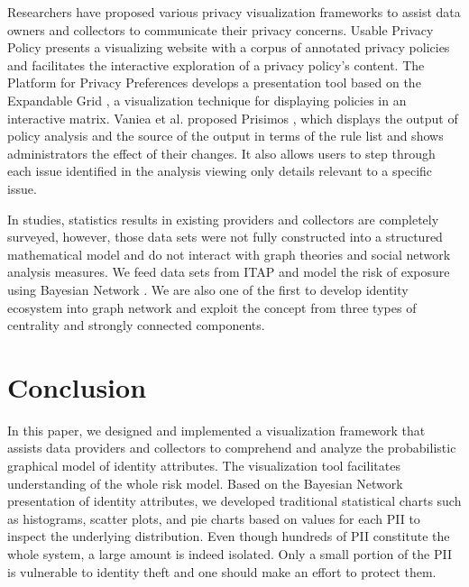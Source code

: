 \documentclass[conference]{IEEEtran}
\begin{document}
Researchers have proposed various privacy visualization frameworks to assist data owners and collectors to communicate their privacy concerns. Usable Privacy Policy \cite{Cherivirala2016VisualizationAI} presents a visualizing website with a corpus of annotated privacy policies and facilitates the interactive exploration of a privacy policy's content. The Platform for Privacy Preferences \cite{FaithCranor2011} develops a presentation
tool based on the Expandable Grid \cite{ExpandableGrid}, a visualization technique for displaying policies in an interactive matrix. Vaniea et al. proposed Prisimos \cite{Prisimos}, which displays the output of policy analysis and the source of the output in terms of the rule list and shows administrators the effect of their changes. It also allows users to step through each issue identified in the analysis viewing only details relevant to a specific issue. 


 
In studies, statistics results in existing providers and collectors are completely surveyed, however, those data sets were not fully constructed into a structured mathematical model and do not interact with graph theories and social network analysis measures. We feed data sets from ITAP and model the risk of exposure using Bayesian Network \cite{EcosystemModeling}. We are also one of the first to develop identity ecosystem into graph network and exploit the concept from three types of centrality and strongly connected components.  

\section{Conclusion}

In this paper, we designed and implemented a visualization framework that assists data providers and collectors to comprehend and analyze the probabilistic graphical model of identity attributes. The visualization tool facilitates understanding of the whole risk model. Based on the Bayesian Network presentation of identity attributes, we developed traditional statistical charts such as histograms, scatter plots, and pie charts based on values for each PII to inspect the underlying distribution. Even though hundreds of PII constitute the whole system, a large amount is indeed isolated. Only a small portion of the PII is vulnerable to identity theft and one should make an effort to protect them.
\end{document}
